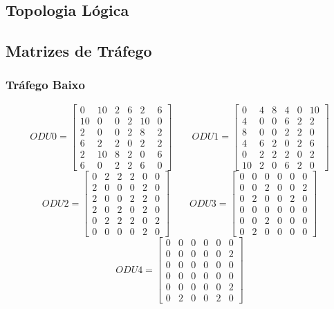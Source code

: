\subsection{Topologia Lógica}


\subsection{Matrizes de Tráfego}

\subsubsection{Tráfego Baixo}
\label{low}

\[
ODU0=
  \begin{bmatrix}
    0 & 10 & 2 & 6 & 2 & 6 \\
    10 & 0 & 0 & 2 & 10 & 0 \\
    2 & 0 & 0 & 2 & 8 & 2 \\
    6 & 2 & 2 & 0 & 2 & 2 \\
    2 & 10 & 8 & 2 & 0 & 6 \\
    6 & 0 & 2 & 2 & 6 & 0
  \end{bmatrix}
\qquad ODU1=
  \begin{bmatrix}
    0 & 4 & 8 & 4 & 0 & 10 \\
    4 & 0 & 0 & 6 & 2 & 2 \\
    8 & 0 & 0 & 2 & 2 & 0 \\
    4 & 6 & 2 & 0 & 2 & 6 \\
    0 & 2 & 2 & 2 & 0 & 2 \\
    10 & 2 & 0 & 6 & 2 & 0
  \end{bmatrix}
\]
\[
ODU2=
  \begin{bmatrix}
    0 & 2 & 2 & 2 & 0 & 0 \\
    2 & 0 & 0 & 0 & 2 & 0 \\
    2 & 0 & 0 & 2 & 2 & 0 \\
    2 & 0 & 2 & 0 & 2 & 0 \\
    0 & 2 & 2 & 2 & 0 & 2 \\
    0 & 0 & 0 & 0 & 2 & 0
  \end{bmatrix}
\qquad ODU3=
  \begin{bmatrix}
    0 & 0 & 0 & 0 & 0 & 0 \\
    0 & 0 & 2 & 0 & 0 & 2 \\
    0 & 2 & 0 & 0 & 2 & 0 \\
    0 & 0 & 0 & 0 & 0 & 0 \\
    0 & 0 & 2 & 0 & 0 & 0 \\
    0 & 2 & 0 & 0 & 0 & 0
  \end{bmatrix}
\]
\[
ODU4=
  \begin{bmatrix}
    0 & 0 & 0 & 0 & 0 & 0 \\
    0 & 0 & 0 & 0 & 0 & 2 \\
    0 & 0 & 0 & 0 & 0 & 0 \\
    0 & 0 & 0 & 0 & 0 & 0 \\
    0 & 0 & 0 & 0 & 0 & 2 \\
    0 & 2 & 0 & 0 & 2 & 0
  \end{bmatrix}
\]


